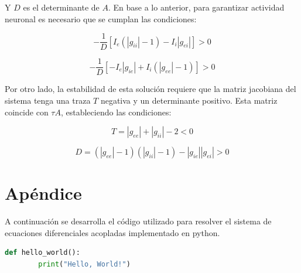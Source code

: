 \documentclass[aps,prb,twocolumn,superscriptaddress,floatfix,longbibliography]{revtex4-2}
\newcounter{para}
\begin{document}
Y \(D\) es el determinante de \(A\). En base a lo anterior, para garantizar actividad neuronal es necesario que se cumplan las condiciones:

\[ -\frac{1}{D} [ I_e (|g_{ii}| - 1) - I_i |g_{ei}| ] > 0 \]

\[ -\frac{1}{D} [ -I_e |g_{ie}| + I_i (|g_{ee}| - 1) ] > 0 \]

Por otro lado, la estabilidad de esta solución requiere que la matriz jacobiana del sistema tenga una traza \(T\) negativa y un determinante positivo. Esta matriz coincide con \(\tau A\), estableciendo las condiciones:

\[ T = |g_{ee}| + |g_{ii}| - 2 < 0 \]

\[ D = (|g_{ee}| - 1)(|g_{ii}| - 1) - |g_{ie}||g_{ei}| > 0 \]



\section{Apéndice}

A continuación se desarrolla el código utilizado para resolver el sistema de ecuaciones diferenciales acopladas implementado en python.

\begin{lstlisting}[language=Python]
    def hello_world():
        print("Hello, World!")
    \end{lstlisting}
    


\end{document}
